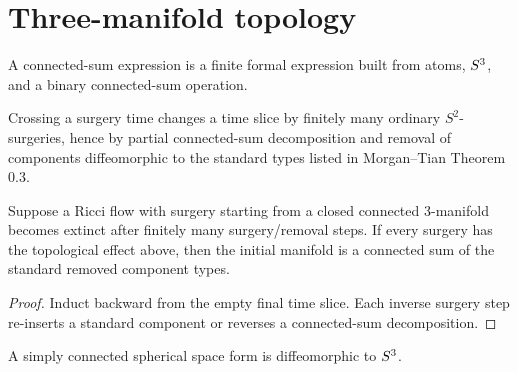 \chapter{Three-manifold topology}

\begin{definition}
  \label{def:connected-sum-expression}
  A connected-sum expression is a finite formal expression built from atoms,
  $S^3$, and a binary connected-sum operation.
\end{definition}

\begin{theorem}
  \label{thm:surgery-topological-effect}
  \notready
  Crossing a surgery time changes a time slice by finitely many ordinary
  $S^2$-surgeries, hence by partial connected-sum decomposition and removal of
  components diffeomorphic to the standard types listed in Morgan--Tian
  Theorem 0.3.
\end{theorem}

\begin{theorem}
  \label{thm:extinction-to-connected-sum-classification}
  \notready
  Suppose a Ricci flow with surgery starting from a closed connected 3-manifold
  becomes extinct after finitely many surgery/removal steps. If every surgery has
  the topological effect above, then the initial manifold is a connected sum of
  the standard removed component types.
\end{theorem}

\begin{proof}
  Induct backward from the empty final time slice. Each inverse surgery step
  re-inserts a standard component or reverses a connected-sum decomposition.
\end{proof}

\begin{theorem}
  \label{thm:simply-connected-spherical-space-form}
  \notready
  A simply connected spherical space form is diffeomorphic to $S^3$.
\end{theorem}

